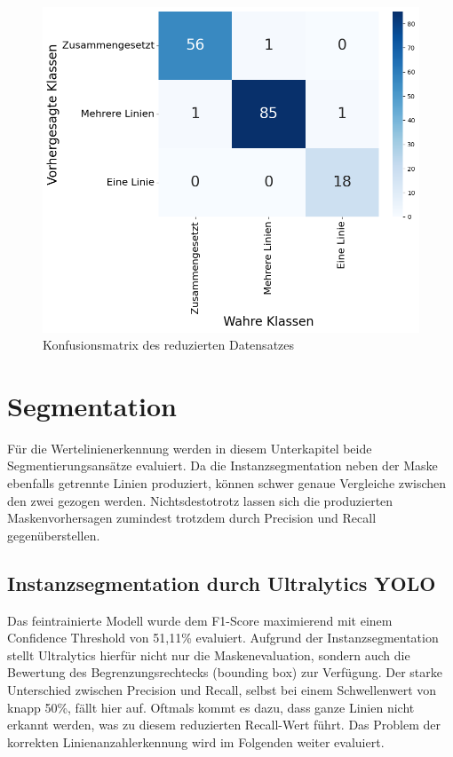 \begin{figure}[H]
    \centering
    \captionsetup{width=.75\linewidth}
    \includegraphics[width=.75\textwidth]{Experimente/img/classify/val_v2/matrix.png}
    \caption{ Konfusionsmatrix des reduzierten Datensatzes}
    \label{fig:val_v2_matrix}
\end{figure}

\section{Segmentation}

Für die Wertelinienerkennung werden in diesem Unterkapitel beide Segmentierungsansätze evaluiert. Da die Instanzsegmentation neben der Maske ebenfalls getrennte Linien produziert, können schwer genaue Vergleiche zwischen den zwei gezogen werden. Nichtsdestotrotz lassen sich die produzierten Maskenvorhersagen zumindest trotzdem durch Precision und Recall gegenüberstellen.


\subsection{Instanzsegmentation durch Ultralytics YOLO}

Das feintrainierte Modell wurde dem F1-Score maximierend mit einem Confidence Threshold von 51,11\% evaluiert. Aufgrund der Instanzsegmentation stellt Ultralytics hierfür nicht nur die Maskenevaluation, sondern auch die Bewertung des Begrenzungsrechtecks (bounding box) zur Verfügung. Der starke Unterschied zwischen Precision und Recall, selbst bei einem Schwellenwert von knapp 50\%, fällt hier auf. Oftmals kommt es dazu, dass ganze Linien nicht erkannt werden, was zu diesem reduzierten Recall-Wert führt. Das Problem der korrekten Linienanzahlerkennung wird im Folgenden weiter evaluiert.

